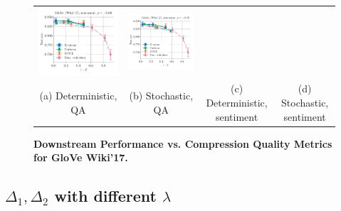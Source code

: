 \begin{figure}
\begin{tabular}{@{\hskip -0.0in}c@{\hskip -0.0in}c@{\hskip -0.0in}c@{\hskip -0.0in}c@{\hskip -0.0in}}
		\includegraphics[width=.245\linewidth]{figures/glove-wiki400k-am_sentiment_sst_test-acc_vs_subspace-dist-normalized_linx_det.pdf} & 
		\includegraphics[width=.245\linewidth]{figures/glove-wiki400k-am_sentiment_sst_test-acc_vs_subspace-dist-normalized_linx_stoc.pdf} \\
		(a) Deterministic, QA & (b) Stochastic, QA  & (c) Deterministic, sentiment & (d) Stochastic, sentiment
	\end{tabular}
	\caption{
		\textbf{Downstream Performance vs. Compression Quality Metrics for GloVe Wiki'17.}}
	\label{fig:bad_correlation_wiki17}
\end{figure}


\subsection{$\Delta_1, \Delta_2$ with different $\lambda$}
\label{subsec:diff_lambdas}

